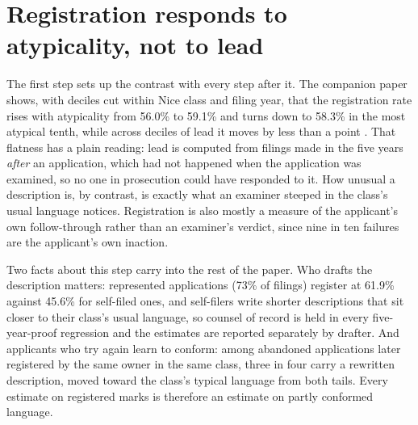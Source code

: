\section{Registration responds to atypicality, not to lead}\label{sec:registration}\label{sec:reg_rates}\label{sec:representation}\label{sec:amend}

The first step sets up the contrast with every step after it. The
companion paper shows, with deciles cut within Nice class and filing
year, that the registration rate rises with atypicality from 56.0\% to
59.1\% and turns down to 58.3\% in the most atypical tenth, while across
deciles of lead it moves by less than a point \citep{SilverCorpus2026}.
That flatness has a plain reading: lead is computed from filings made in
the five years \emph{after} an application, which had not happened when
the application was examined, so no one in prosecution could have
responded to it. How unusual a description is, by contrast, is exactly
what an examiner steeped in the class's usual language notices.
Registration is also mostly a measure of the applicant's own
follow-through rather than an examiner's verdict, since nine in ten
failures are the applicant's own inaction.

Two facts about this step carry into the rest of the paper. Who drafts
the description matters: represented applications (73\% of filings)
register at 61.9\% against 45.6\% for self-filed ones, and self-filers
write shorter descriptions that sit closer to their class's usual
language, so counsel of record is held in every five-year-proof
regression and the estimates are reported separately by drafter. And
applicants who try again learn to conform: among abandoned applications
later registered by the same owner in the same class, three in four
carry a rewritten description, moved toward the class's typical
language from both tails. Every estimate on registered marks is
therefore an estimate on partly conformed language.
